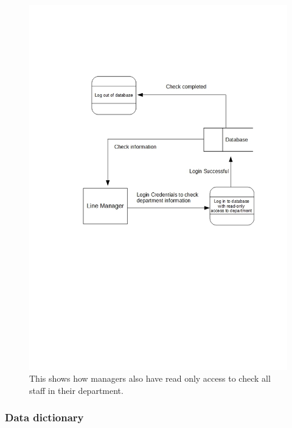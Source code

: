 \begin{figure}[H]
\includegraphics[width=\textwidth]{ManagerReadOnly.jpg}
\caption{This shows how managers also have read only access to check all staff in their department.} \label{Page1Interview}
\end{figure}



\subsubsection{Data dictionary}


